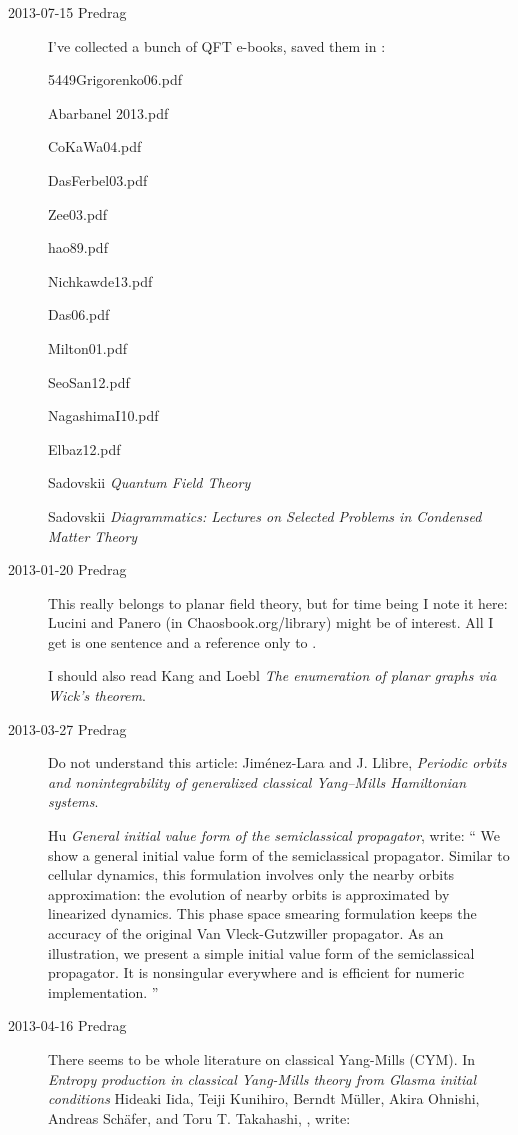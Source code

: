 \begin{description}
\item[2013-07-15 Predrag] I've collected a bunch of QFT e-books, saved
them in :

5449Grigorenko06.pdf

Abarbanel 2013.pdf

CoKaWa04.pdf

DasFerbel03.pdf

Zee03.pdf

hao89.pdf

Nichkawde13.pdf

Das06.pdf

Milton01.pdf

SeoSan12.pdf

NagashimaI10.pdf

Elbaz12.pdf

Sadovskii {\em Quantum Field Theory}

Sadovskii
{\em Diagrammatics: Lectures on Selected Problems in Condensed Matter Theory}





\item[2013-01-20  Predrag]
This really belongs to planar field theory, but for time being I note
it here: Lucini and Panero (in Chaosbook.org/library)
might be of interest. All I get is one sentence and a reference only
to .

I should also read Kang and Loebl
{\em The enumeration of planar graphs via {Wick}'s theorem}.

\item[2013-03-27  Predrag] Do not understand this article:
Jim\'enez-Lara and J. Llibre,
{\em Periodic orbits and nonintegrability of generalized
classical {Yang--Mills Hamiltonian} systems}.

Hu
{\em General initial value form of the semiclassical propagator},
write: ``
We show a general initial value form of the semiclassical propagator.
Similar to cellular dynamics, this formulation involves only the
nearby orbits approximation: the evolution of nearby orbits is
approximated by linearized dynamics. This phase space smearing
formulation keeps the accuracy of the original Van Vleck-Gutzwiller
propagator. As an illustration, we present a simple initial value
form of the semiclassical propagator. It is nonsingular everywhere
and is efficient for numeric implementation.
''

\item[2013-04-16  Predrag] There seems to be whole literature on
classical Yang-Mills (CYM). In
{\em Entropy production in classical Yang-Mills theory from Glasma
initial conditions} Hideaki Iida,  Teiji Kunihiro,  Berndt M\"uller,
Akira Ohnishi,  Andreas Sch\"afer,  and Toru T. Takahashi,
, %
write:


\end{description}

